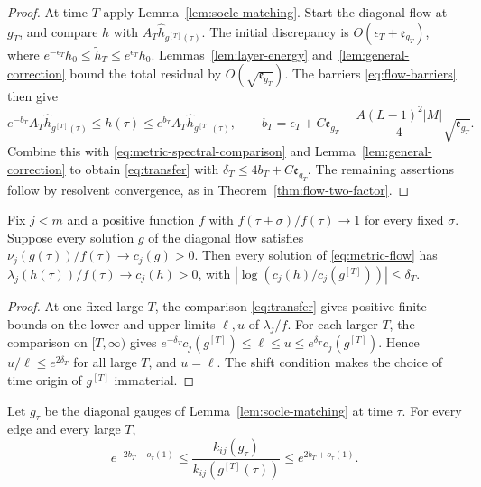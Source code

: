 \begin{proof}
At time $T$ apply Lemma~\ref{lem:socle-matching}. Start the diagonal flow
at $g_T$, and compare $h$ with $A_T\widehat h_{g^{[T]}(\tau)}$. The initial
discrepancy is $O(\epsilon_T+\mathfrak e_{g_T})$, where
$e^{-\epsilon_T}h_0\le\widetilde h_T\le e^{\epsilon_T}h_0$.
Lemmas~\ref{lem:layer-energy} and~\ref{lem:general-correction} bound the
total residual by $O(\sqrt{\mathfrak e_{g_T}})$. The barriers \eqref{eq:flow-barriers}
then give
\begin{equation}\label{eq:general-restarted-barrier}
 e^{-b_T}A_T\widehat h_{g^{[T]}(\tau)}\le h(\tau)\le
 e^{b_T}A_T\widehat h_{g^{[T]}(\tau)},\qquad
 b_T=\epsilon_T+C\mathfrak e_{g_T}+\frac{A(L-1)^2|M|}{4}\sqrt{\mathfrak e_{g_T}}.
\end{equation}
Combine this with \eqref{eq:metric-spectral-comparison} and
Lemma~\ref{lem:general-correction} to obtain \eqref{eq:transfer} with
$\delta_T\le4b_T+C\mathfrak e_{g_T}$. The remaining assertions follow by
resolvent convergence, as in Theorem~\ref{thm:flow-two-factor}.
\end{proof}

\begin{corollary}\label{cor:coefficient-transfer}
Fix $j<m$ and a positive function $f$ with $f(\tau+\sigma)/f(\tau)\to1$ for
every fixed $\sigma$. Suppose every solution $g$ of the diagonal flow satisfies
$\nu_j(g(\tau))/f(\tau)\to c_j(g)>0$. Then every solution of
\eqref{eq:metric-flow} has $\lambda_j(h(\tau))/f(\tau)\to c_j(h)>0$, with
$|\log(c_j(h)/c_j(g^{[T]}))|\le\delta_T$.
\end{corollary}

\begin{proof}
At one fixed large $T$, the comparison \eqref{eq:transfer} gives positive
finite bounds on the lower and upper limits $\ell,u$ of $\lambda_j/f$. For
each larger $T$, the comparison on $[T,\infty)$ gives
$e^{-\delta_T}c_j(g^{[T]})\le\ell\le u\le e^{\delta_T}c_j(g^{[T]})$. Hence
$u/\ell\le e^{2\delta_T}$ for all large $T$, and $u=\ell$. The shift
condition makes the choice of time origin of $g^{[T]}$ immaterial.
\end{proof}

\begin{lemma}\label{lem:instantaneous-edges}
Let $g_\tau$ be the diagonal gauges of Lemma~\ref{lem:socle-matching} at
time $\tau$. For every edge and every large $T$,
\[
 e^{-2b_T-o_\tau(1)}\le\frac{k_{ij}(g_\tau)}{k_{ij}(g^{[T]}(\tau))}
 \le e^{2b_T+o_\tau(1)}.
\]
\end{lemma}

